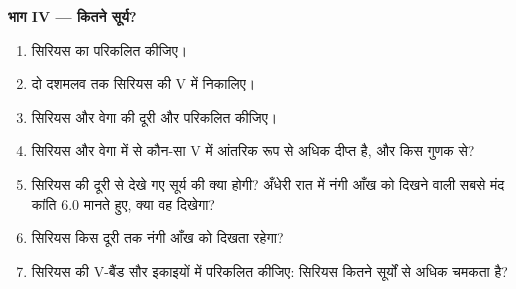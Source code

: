 \begin{problem}
\medskip
\noindent\textbf{भाग IV --- कितने सूर्य?}
\begin{enumerate}[resume]
  \item सिरियस का  परिकलित कीजिए।
  \item दो दशमलव तक सिरियस की V में  निकालिए।
  \item सिरियस और वेगा की दूरी और  परिकलित कीजिए।
  \item सिरियस और वेगा में से कौन-सा V में आंतरिक रूप से अधिक दीप्त है, और किस गुणक से?
  \item सिरियस की दूरी से देखे गए सूर्य की  क्या होगी? अँधेरी रात में नंगी आँख को दिखने वाली सबसे मंद कांति 6.0 मानते हुए, क्या वह दिखेगा?
  \item सिरियस किस दूरी तक नंगी आँख को दिखता रहेगा?
  \item सिरियस की V-बैंड  सौर इकाइयों में परिकलित कीजिए: सिरियस कितने सूर्यों से अधिक चमकता है?
\end{enumerate}
\end{problem}
